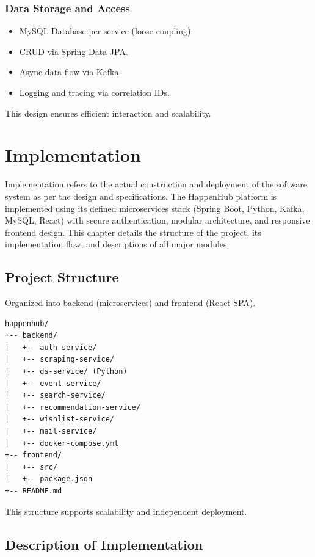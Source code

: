 \documentclass[12pt, a4paper]{report}
\begin{document}
\subsection{Data Storage and Access}
\begin{itemize}
    \item MySQL Database per service (loose coupling).
    \item CRUD via Spring Data JPA.
    \item Async data flow via Kafka.
    \item Logging and tracing via correlation IDs.
\end{itemize}

\noindent This design ensures efficient interaction and scalability.

\chapter{Implementation}

Implementation refers to the actual construction and deployment of the software system as per the design and specifications. The HappenHub platform is implemented using its defined microservices stack (Spring Boot, Python, Kafka, MySQL, React) with secure authentication, modular architecture, and responsive frontend design. This chapter details the structure of the project, its implementation flow, and descriptions of all major modules.

\section{Project Structure}
Organized into backend (microservices) and frontend (React SPA).
\begin{verbatim}
happenhub/
+-- backend/
|   +-- auth-service/
|   +-- scraping-service/
|   +-- ds-service/ (Python)
|   +-- event-service/
|   +-- search-service/
|   +-- recommendation-service/
|   +-- wishlist-service/
|   +-- mail-service/
|   +-- docker-compose.yml
+-- frontend/
|   +-- src/
|   +-- package.json
+-- README.md
\end{verbatim}
This structure supports scalability and independent deployment.

\section{Description of Implementation}
\end{document}
